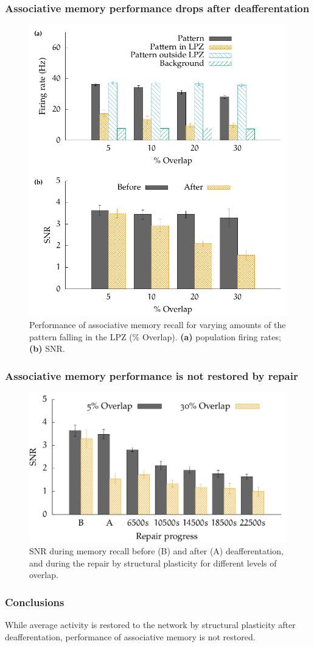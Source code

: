 \begin{frame}[c]
  \frametitle{Associative memory performance drops after deafferentation}
  \begin{figure}[h]
    \centering
    \includegraphics[width=0.55\linewidth]{99_images/performance-deaff-only}
    \caption{Performance of associative memory recall for varying amounts of the pattern falling in the LPZ (\% Overlap). \textbf{(a)} population firing rates; \textbf{(b)} SNR\@.}
  \end{figure}
\end{frame}
\begin{frame}[c]
  \frametitle{Associative memory performance is not restored by repair}
  \begin{figure}[h]
    \centering
    \includegraphics[width=0.6\linewidth]{99_images/performance-during-repair}
    \caption{SNR during memory recall before (B) and after (A) deafferentation, and during the repair by structural plasticity for different levels of overlap.}
  \end{figure}
\end{frame}
\begin{frame}[c]
  \frametitle{Conclusions}
  While average activity is restored to the network by structural plasticity after deafferentation, \alert{performance of associative memory is not restored}.
\end{frame}
